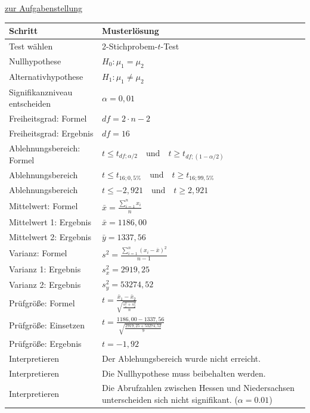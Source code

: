 \documentclass[
  11pt,
  ngerman,
  a4paper,
]{report}
\begin{document}
\protect\hyperlink{aufgabe-6-7}{zur Aufgabenstellung}

\begin{table}[H]
\centering
\begin{tabular}{ll}
\toprule
\textbf{Schritt} & \textbf{Musterlösung}\\
\midrule
Test wählen & 2-Stichprobem-$t$-Test\\
Nullhypothese & $H_0: \mu_1 = \mu_2$\\
Alternativhypothese & $H_1: \mu_1 \neq \mu_2$\\
Signifikanzniveau entscheiden & $\alpha=0,01$\\
Freiheitsgrad: Formel & $\mathit{df} = 2\cdot n - 2$\\
Freiheitsgrad: Ergebnis & $\mathit{df} = 16$\\
Ablehnungsbereich: Formel & $t \leq t_{\mathit{df};\alpha/2} \quad \textrm{und} \quad t \geq t_{\mathit{df};(1-\alpha/2)}$\\
Ablehnungsbereich & $t \leq t_{16;0{,}5\%} \quad \textrm{und} \quad t \geq t_{16;99{,}5\%}$\\
Ablehnungsbereich & $t \leq-2{,}921\quad \textrm{und} \quad t \geq2{,}921$\\
Mittelwert: Formel & $\bar{x}=\frac{\sum\limits_{i=1}^{n}x_{i}}{n}$\\
Mittelwert 1: Ergebnis & $\bar{x}=1186{,}00$\\
Mittelwert 2: Ergebnis & $\bar{y}=1337{,}56$\\
Varianz: Formel & $s^2=\frac{\sum\limits_{i=1}^{n}(x_{i}-\bar{x})^2}{n-1}$\\
Varianz 1: Ergebnis & $s^2_x=2919{,}25$\\
Varianz 2: Ergebnis & $s^2_y=53274{,}52$\\
Prüfgröße: Formel & $t=\frac{\bar{x}_1-\bar{x}_2}{\sqrt{\frac{s^2_1+s^2_2}{n}}}$\\
Prüfgröße: Einsetzen & $t=\frac{1186{,}00-1337{,}56}{\sqrt{\frac{2919{,}25+53274{,}52}{9}}}$\\
Prüfgröße: Ergebnis & $t =-1{,}92$\\
Interpretieren & Der Ablehungsbereich wurde nicht erreicht.\\
Interpretieren & Die Nullhypothese muss beibehalten werden.\\
Interpretieren & Die Abrufzahlen zwischen Hessen und Niedersachsen unterscheiden sich nicht signifikant. ($\alpha=0.01$)\\
\bottomrule
\end{tabular}
\end{table}
\end{document}
